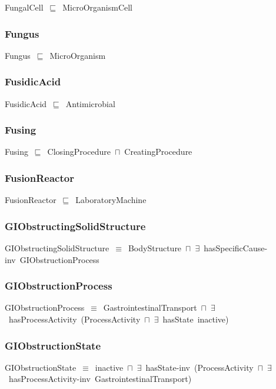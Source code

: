 \documentclass{article}
\begin{document}
FungalCell~\ensuremath{\sqsubseteq}~MicroOrganismCell~

\subsubsection*{Fungus}

Fungus~\ensuremath{\sqsubseteq}~MicroOrganism~

\subsubsection*{FusidicAcid}

FusidicAcid~\ensuremath{\sqsubseteq}~Antimicrobial~

\subsubsection*{Fusing}

Fusing~\ensuremath{\sqsubseteq}~ClosingProcedure~\ensuremath{\sqcap}~CreatingProcedure~

\subsubsection*{FusionReactor}

FusionReactor~\ensuremath{\sqsubseteq}~LaboratoryMachine~

\subsubsection*{GIObstructingSolidStructure}

GIObstructingSolidStructure~\ensuremath{\equiv}~BodyStructure~\ensuremath{\sqcap}~\ensuremath{\exists}~hasSpecificCause-inv~GIObstructionProcess

\subsubsection*{GIObstructionProcess}

GIObstructionProcess~\ensuremath{\equiv}~GastrointestinalTransport~\ensuremath{\sqcap}~\ensuremath{\exists}~hasProcessActivity~(ProcessActivity~\ensuremath{\sqcap}~\ensuremath{\exists}~hasState~inactive)

\subsubsection*{GIObstructionState}

GIObstructionState~\ensuremath{\equiv}~inactive~\ensuremath{\sqcap}~\ensuremath{\exists}~hasState-inv~(ProcessActivity~\ensuremath{\sqcap}~\ensuremath{\exists}~hasProcessActivity-inv~GastrointestinalTransport)
\end{document}
